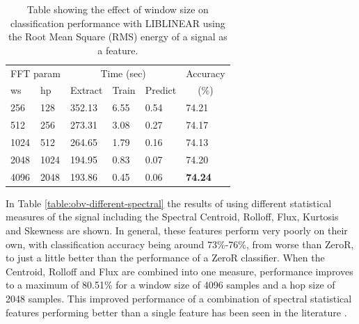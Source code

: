 \documentclass[12pt,oneside]{book}
\begin{document}
\begin{table}
\begin{tabular}{|l|l|l|l|l|l|}
\hline
\multicolumn{2}{|c|}{FFT param} & \multicolumn{3}{c|}{Time (sec)} & Accuracy \\
\hhline{|-|-|-|-|-|~|}
ws & hp & Extract & Train & Predict & \multicolumn{1}{c|}{(\%)} \\
\hhline{|=|=|=|=|=|=|}
256 & 128    &   352.13  &    6.55  &   0.54  &  74.21  \\
512 & 256    &   273.31  &    3.08  &   0.27  &  74.17  \\
1024 & 512   &   264.65  &    1.79  &   0.16  &  74.13  \\
2048 & 1024  &   194.95  &    0.83  &   0.07  &  74.20  \\
4096 & 2048  &   193.86  &    0.45  &   0.06  &  \textbf{74.24}  \\
\hline
\end{tabular}
\caption{Table showing the effect of window size on classification
  performance with LIBLINEAR using the Root Mean Square (RMS) energy
  of a signal as a feature.}
\label{table:obv-different-rms}
\end{table}

In Table \ref{table:obv-different-spectral} the results of using
different statistical measures of the signal including the Spectral
Centroid, Rolloff, Flux, Kurtosis and Skewness are shown.  In general,
these features perform very poorly on their own, with classification
accuracy being around 73\%-76\%, from worse than ZeroR, to just a
little better than the performance of a ZeroR classifier.  When the
Centroid, Rolloff and Flux are combined into one measure, performance
improves to a maximum of 80.51\% for a window size of 4096 samples and
a hop size of 2048 samples.  This improved performance of a
combination of spectral statistical features performing better than a
single feature has been seen in the literature
\cite{tzanetakis2008marsyas}.
\end{document}

